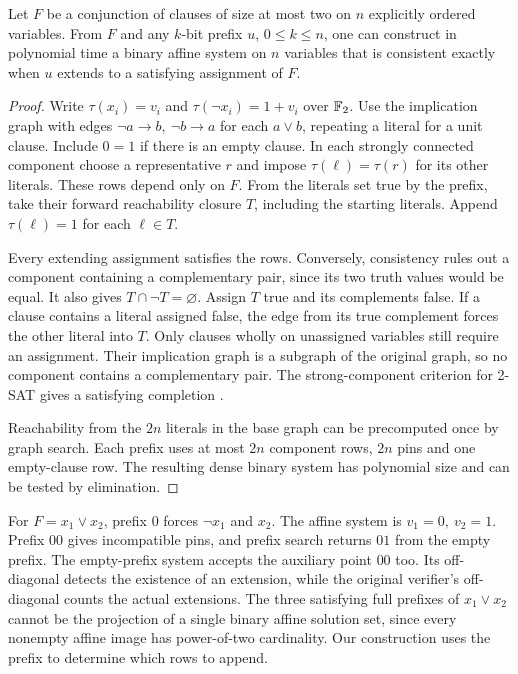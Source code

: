 \begin{proposition}
\label{prop:two-cnf-prefix}
Let \(F\) be a conjunction of clauses of size at most two on \(n\)
explicitly ordered variables. From \(F\) and any \(k\)-bit prefix \(u\),
\(0\le k\le n\), one can construct in polynomial time a binary affine
system on \(n\) variables that is consistent exactly when \(u\)
extends to a satisfying assignment of \(F\).
\end{proposition}
\begin{proof}
Write \(\tau(x_i)=v_i\) and \(\tau(\neg x_i)=1+v_i\) over \(\mathbb F_2\).
Use the implication graph with edges \(\neg a\to b,\ \neg b\to a\)
for each \(a\lor b\), repeating a literal for a unit clause. Include
\(0=1\) if there is an empty clause. In each strongly connected
component choose a representative \(r\) and impose
\(\tau(\ell)=\tau(r)\) for its other literals. These rows depend only
on \(F\). From the literals set true by the prefix, take their
forward reachability closure \(T\), including the starting literals.
Append \(\tau(\ell)=1\) for each \(\ell\in T\).

Every extending assignment satisfies the rows. Conversely, consistency
rules out a component containing a complementary pair, since its two
truth values would be equal. It also gives \(T\cap\neg T=\varnothing\).
Assign \(T\) true and its complements false. If a clause contains a
literal assigned false, the edge from its true complement forces the
other literal into \(T\). Only clauses wholly on unassigned variables
still require an assignment. Their implication graph is a subgraph of
the original graph, so no component contains a complementary pair.
The strong-component criterion for 2-SAT gives a satisfying completion
\cite[Theorem~1]{aspvallplassTarjan}.

Reachability from the \(2n\) literals in the base graph can be
precomputed once by graph search. Each prefix uses at most \(2n\)
component rows, \(2n\) pins and one empty-clause row. The resulting
dense binary system has polynomial size and can be tested by elimination.
\end{proof}
For \(F=x_1\lor x_2\), prefix \(0\) forces \(\neg x_1\) and \(x_2\).
The affine system is \(v_1=0,\ v_2=1\). Prefix \(00\) gives incompatible
pins, and prefix search returns \(01\) from the empty prefix. The
empty-prefix system accepts the auxiliary point \(00\) too. Its
off-diagonal detects the existence of an extension, while the
original verifier's off-diagonal counts the actual extensions.
The three satisfying full prefixes of \(x_1\lor x_2\) cannot be the
projection of a single binary affine solution set, since every
nonempty affine image has power-of-two cardinality. Our construction
uses the prefix to determine which rows to append.
